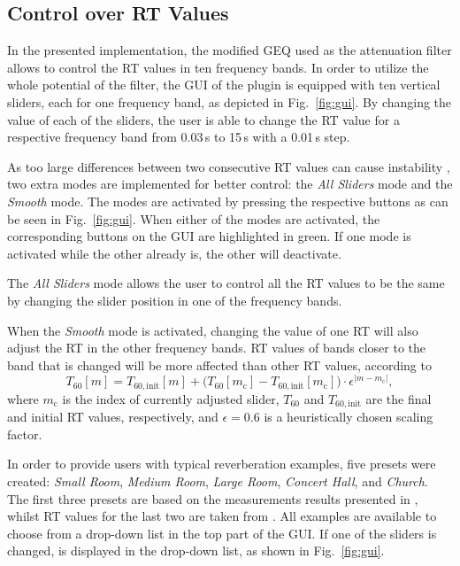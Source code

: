 \documentclass[twoside,a4paper]{article}
\begin{document}



\subsection{Control over RT Values}
In the presented implementation, the modified GEQ used as the attenuation filter allows to control the RT values in ten frequency bands. In order to utilize the whole potential of the filter, the GUI of the plugin is equipped with ten vertical sliders, each for one frequency band, as depicted in Fig.~\ref{fig:gui}. By changing the value of each of the sliders, the user is able to change the RT value for a respective frequency band from 0.03\,s to 15\,s with a 0.01\,s step. 

As too large differences between two consecutive RT values can cause instability \cite{prawda:2019:improved}, two extra modes are implemented for better control: the \textit{All Sliders} mode and the \textit{Smooth} mode. The modes are activated by pressing the respective buttons as can be seen in Fig.~\ref{fig:gui}. When either of the modes are activated, the corresponding buttons on the GUI are highlighted in green. If one mode is activated while the other already is, the other will deactivate.

The \textit{All Sliders} mode allows the user to control all the RT values to be the same by changing the slider position in one of the frequency bands. 

When the \textit{Smooth} mode is activated, changing the value of one RT will also adjust the RT in the other frequency bands. RT values of bands closer to the band that is changed will be more affected than other RT values, according to
\begin{equation}
T_{60}[m] = T_{60, \textrm{init}}[m] + \Big(T_{60}[m_\text{c}] - T_{60, \textrm{init}}[m_\text{c}]\Big) \cdot \epsilon^{|m-m_\text{c}|},
\label{eq:smooth}
\end{equation}
%
where $m_\text{c}$ is the index of currently adjusted slider, $T_{60}$ and $T_{60, \text{init}}$ are the final and initial RT values, respectively, and $\epsilon = 0.6$ is a heuristically chosen scaling factor.

In order to provide users with typical reverberation examples, five presets were created: \textit{Small Room}, \textit{Medium Room}, \textit{Large Room}, \textit{Concert Hall}, and \textit{Church}. The first three presets are based on the measurements results presented in \cite{jeub09}, whilst RT values for the last two are taken from \cite{air}. All examples are available to choose from a drop-down list in the top part of the GUI. If one of the sliders is changed,  is displayed in the drop-down list, as shown in Fig.~\ref{fig:gui}.
\end{document}

